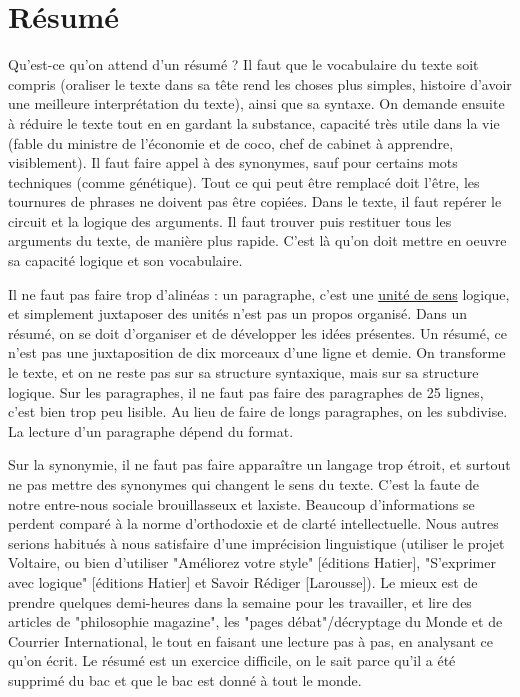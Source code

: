 \documentclass[a4paper,12pt]{book}
\begin{document}
\section{Résumé}
Qu'est-ce qu'on attend d'un résumé ? Il faut que le vocabulaire du texte soit compris (oraliser le texte dans sa tête rend les choses plus simples, histoire d'avoir une meilleure interprétation du texte), ainsi que sa syntaxe. On demande ensuite à réduire le texte tout en en gardant la substance, capacité très utile dans la vie (fable du ministre de l'économie et de coco, chef de cabinet à apprendre, visiblement). Il faut faire appel à des synonymes, sauf pour certains mots techniques (comme génétique). Tout ce qui peut être remplacé doit l'être, les tournures de phrases ne doivent pas être copiées. Dans le texte, il faut repérer le circuit et la logique des arguments. Il faut trouver puis restituer tous les arguments du texte, de manière plus rapide. C'est là qu'on doit mettre en oeuvre sa capacité logique et son vocabulaire.
\par Il ne faut pas faire trop d'alinéas : un paragraphe, c'est une \underline{unité de sens} logique, et simplement juxtaposer des unités n'est pas un propos organisé. Dans un résumé, on se doit d'organiser et de développer les idées présentes. Un résumé, ce n'est pas une juxtaposition de dix morceaux d'une ligne et demie. On transforme le texte, et on ne reste pas sur sa structure syntaxique, mais sur sa structure logique. Sur les paragraphes, il ne faut pas faire des paragraphes de 25 lignes, c'est bien trop peu lisible. Au lieu de faire de longs paragraphes, on les subdivise. La lecture d'un paragraphe dépend du format.  
\par Sur la synonymie, il ne faut pas faire apparaître un langage trop étroit, et surtout ne pas mettre des synonymes qui changent le sens du texte. C'est la faute de notre entre-nous sociale brouillasseux et laxiste. Beaucoup d'informations se perdent comparé à la norme d'orthodoxie et de clarté intellectuelle. Nous autres serions habitués à nous satisfaire d'une imprécision linguistique (utiliser le projet Voltaire, ou bien d'utiliser "Améliorez votre style" [éditions Hatier], "S'exprimer avec logique" [éditions Hatier] et Savoir Rédiger [Larousse]). Le mieux est de prendre quelques demi-heures dans la semaine pour les travailler, et lire des articles de "philosophie magazine", les "pages débat"/décryptage du Monde et de Courrier International, le tout en faisant une lecture pas à pas, en analysant ce qu'on écrit. Le résumé est un exercice difficile, on le sait parce qu'il a été supprimé du bac et que le bac est donné à tout le monde.
\end{document}

